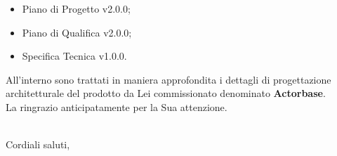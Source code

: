\documentclass[10pt,a4paper]{letter} %
\begin{document}
\begin{letter}{}
\begin{itemize}
\begin{itemize}
    \item Piano di Progetto v2.0.0;
    \item Piano di Qualifica v2.0.0;
    \item Specifica Tecnica v1.0.0.
    \end{itemize}
  \end{itemize}
  All'interno sono trattati in maniera approfondita i dettagli di progettazione architetturale del prodotto
  da Lei commissionato denominato \textbf{Actorbase}.\\
  La ringrazio anticipatamente per la Sua attenzione. \\ \\
  \closing{Cordiali saluti,}
\end{letter}
\end{document}
